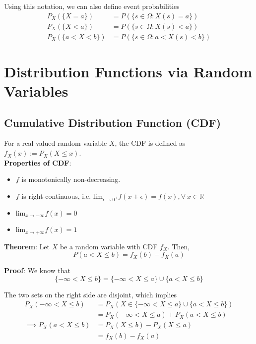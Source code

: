 \documentclass{report}
\begin{document}
\noindent Using this notation, we can also define event probabilities
\begin{align*}
  P_X(\{X = a\})     & = P(\{ s \in \Omega : X(s) = a \})     \\
  P_X(\{X < a\})     & = P(\{ s \in \Omega : X(s) < a \})     \\
  P_X(\{a < X < b\}) & = P(\{ s \in \Omega : a < X(s) < b \})
\end{align*}

\section{Distribution Functions via Random Variables}
\subsection{Cumulative Distribution Function (CDF)}

\noindent For a real-valued random variable $X$, the CDF is defined as $f_X(x) := P_X(X \leq x)$. \\

\noindent \textbf{Properties of CDF}:
\begin{itemize}
  \item $f$ is monotonically non-decreasing.
  \item $f$ is right-continuous, i.e. $\text{lim}_{\epsilon \rightarrow 0^+} f(x+\epsilon) = f(x), \forall \ x \in \mathbb{R}$
  \item $\text{lim}_{x \rightarrow -\infty} f(x) = 0$
  \item $\text{lim}_{x \rightarrow +\infty} f(x) = 1$
\end{itemize}

\newpage

\noindent \textbf{Theorem}: Let $X$ be a random variable with CDF $f_X$. Then, $$P(a < X \leq b) = f_X(b) - f_X(a)$$

\noindent \textbf{Proof}: We know that
$$\{-\infty < X \leq b\} = \{-\infty < X \leq a\} \cup \{a < X \leq b\} $$

\noindent The two sets on the right side are disjoint, which implies
\begin{align*}
  P_X(-\infty < X \leq b)    & = P_X(X \in \{-\infty < X \leq a\} \cup \{a < X \leq b\}) \\
                             & = P_X(-\infty < X \leq a) + P_X(a < X \leq b)             \\
  \implies P_X(a < X \leq b) & = P_X(X \leq b) - P_X(X \leq a)                           \\
                             & = f_X(b) - f_X(a)
\end{align*}
\end{document}
